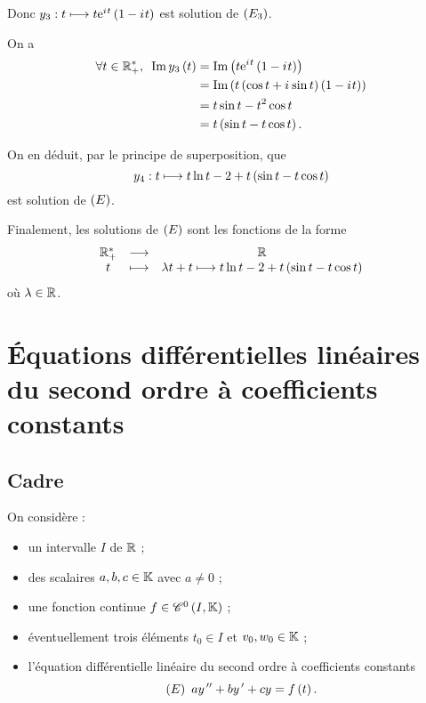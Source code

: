 \begin{corr}
Donc \(y_3:t\longmapsto t\mathrm{e}^{i\mkern1mu t}\left(1-i\mkern1mu t\right)\) est solution de \(\left(E_3\right)\).

On a \[\begin{aligned}
\quantifs{\forall t\in\Rps}\Im y_3\paren{t}&=\Im\paren{t\e{\i t}\paren{1-\i t}} \\
&=\Im\paren{t\paren{\cos t+\i\sin t}\paren{1-\i t}} \\
&=t\sin t-t^2\cos t \\
&=t\paren{\sin t-t\cos t}.
\end{aligned}\]

On en déduit, par le principe de superposition, que \[y_4:t\longmapsto t\ln t-2+t\left(\sin t-t\cos t\right)\] est solution de \(\left(E\right)\).

Finalement, les solutions de \(\left(E\right)\) sont les fonctions de la forme \[\begin{array}[t]{ccc}\mathbb{R}_+^* & \longrightarrow & \mathbb{R} \\ t & \longmapsto & \lambda t+t\longmapsto t\ln t-2+t\left(\sin t-t\cos t\right)\end{array}\] où \(\lambda\in\mathbb{R}\).
\end{corr}

\section{Équations différentielles linéaires du second ordre à coefficients constants}

\subsection{Cadre}

On considère :

\begin{itemize}
\item un intervalle \(I\) de \(\mathbb{R}\) ; \\

\item des scalaires \(a,b,c\in\mathbb{K}\) avec \(a\not=0\) ; \\

\item une fonction continue \(f\in\mathscr{C}^{0}\left(I,\mathbb{K}\right)\) ; \\

\item éventuellement trois éléments \(t_0\in I\) et \(v_0,w_0\in\mathbb{K}\) ; \\

\item l'équation différentielle linéaire du second ordre à coefficients constants \[\left(E\right)~ay^{\,\prime\prime}+by^{\,\prime}+cy=f\left(t\right).\]
\end{itemize}

